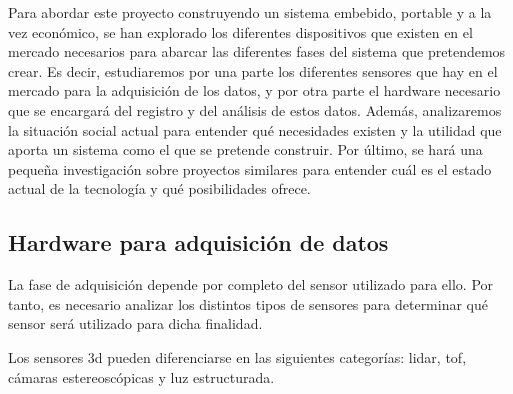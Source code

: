 Para abordar este proyecto construyendo un sistema embebido, portable y a la vez económico, se han explorado los diferentes dispositivos que existen en el mercado necesarios para abarcar las diferentes fases del sistema que pretendemos crear.
Es decir, estudiaremos por una parte los diferentes sensores que hay en el mercado para la adquisición de los datos, y por otra parte el hardware necesario que se encargará del registro y del análisis de estos datos.
Además, analizaremos la situación social actual para entender qué necesidades existen y la utilidad que aporta un sistema como el que se pretende construir.
Por último, se hará una pequeña investigación sobre proyectos similares para entender cuál es el estado actual de la tecnología y qué posibilidades ofrece.

\subsection{Hardware para adquisición de datos}
La fase de adquisición depende por completo del sensor utilizado para ello.
Por tanto, es necesario analizar los distintos tipos de sensores para determinar qué sensor será utilizado para dicha finalidad.



Los sensores \gls{3d} pueden diferenciarse en las siguientes categorías:
\gls{lidar}, \gls{tof}, cámaras estereoscópicas y luz estructurada.

